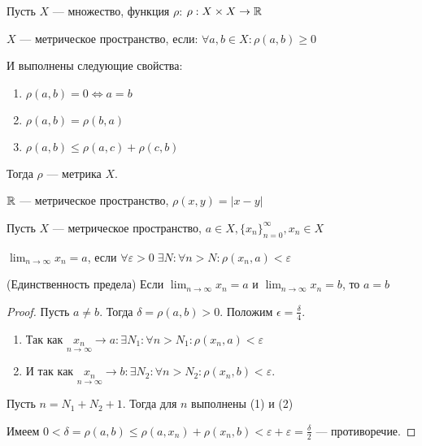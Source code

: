 \begin{definition}
    Пусть $X$ --- множество, функция $\rho$: $\rho: X \times X \to \mathbb{R}$
    
    $X$ --- метрическое пространство, если: $\forall a, b \in X: \rho(a, b) \geq 0$

    И выполнены следующие свойства:
    
    \begin{enumerate}
        \item $\rho(a, b) = 0 \Leftrightarrow a = b$
        \item $\rho(a, b) = \rho(b, a)$
        \item $\rho(a, b) \leq \rho(a, c) + \rho(c, b)$
    \end{enumerate}

    Тогда $\rho$ --- метрика $X$.
\end{definition}

\begin{eg}
    $\mathbb{R}$ --- метрическое пространство, $\rho(x, y) = |x - y|$
\end{eg}

\begin{definition}
    Пусть $X$ --- метрическое пространство, $a \in X, \{x_n\}_{n=0}^{\infty}, x_n \in X$
    
    $\lim_{n \to \infty} x_n = a$, если $\forall \varepsilon > 0 \; \exists N: \forall n > N: \rho(x_n, a) < \varepsilon$
\end{definition}

\begin{theorem} (Единственность предела)
    Если $\lim_{n \to \infty} x_n = a$ и $\lim_{n \to \infty} x_n = b$, то $a = b$
\end{theorem}

\begin{proof}
    Пусть $a \neq b$. Тогда $\delta = \rho(a, b) > 0$. Положим $\epsilon = \frac{\delta}{4}$. 
    
    \begin{enumerate}
        \item Так как $\underset{n \to \infty}{x_n} \to a: \exists N_1: \forall n > N_1: \rho(x_n, a) < \varepsilon$
        \item И так как $\underset{n \to \infty}{x_n} \to b: \exists N_2: \forall n > N_2: \rho(x_n, b) < \varepsilon$.
    \end{enumerate}

    Пусть $n = N_1 + N_2 + 1$. Тогда для $n$ выполнены (1) и (2)
    
    Имеем $0 < \delta = \rho(a, b) \leq \rho(a, x_n) + \rho(x_n, b) < \varepsilon + \varepsilon = \frac{\delta}{2}$ --- противоречие.
\end{proof}

